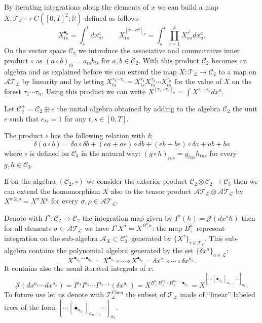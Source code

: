 \documentclass[a4paper,11pt,reqno]{article}
\newcommand{\1}{{\bf 1}}
\newcommand{\der}{\delta}
\newcommand{\RR}{\mathbb{R}}
\newcommand{\CC}{\mathcal{C}}
\newcommand{\LL}{\mathcal{L}}
\newcommand{\cac}{\mathcal C}
\newcommand{\cj}{\mathcal J}
\newcommand{\cl}{\mathcal L}
\newcommand{\TT}{\mathcal{T}}
\newcommand{\cA}{\mathcal{A}}
\newcommand{\troot}{\bullet}
\begin{document}
By iterating integrations along the elements of $x$ we can build a map $X :
\TT_\cl  \to C([0,T]^2; \RR)$ defined as follows
\begin{equation}
\label{eq:it-integrals}
X_{ts}^{\troot_a} = \int_s^t dx_u^a,
\qquad
X_{ts}^{[\tau^1 \cdots \tau^k]_a} = \int_s^t 
\prod_{i=1}^k X_{us}^{\tau^i}
dx_u^a. 
\end{equation}
On the vector space $\cac_2$ we introduce
the associative and commutative inner product $\circ$ as $(a \circ
b)_{ts} = a_{ts} b_{ts}$ for $a,b \in \cac_2$. With this product
$\cac_2$ becomes an algebra and as explained before we can extend the
map $X : \TT_\cl \to \cac_2$ to a map on $\cA
\TT_\cl$ by linearity and by letting $X^{\tau_1 \cdots \tau_n}_{ts} =
X^{\tau_1}_{ts} X^{\tau_2}_{ts} \cdots X^{\tau_n}_{ts}$ for the value
of $X$ on the forest $\tau_1\cdots\tau_n$. Using this product we can
write 
$X^{[\tau_1\cdots\tau_n]_a} = \int X^{\tau_1 \cdots \tau_n} dx^a$. 


Let $\CC^+_2 = \CC_2 \oplus e$ the unital  algebra obtained by adding
to the algebra $\CC_2$ the unit $e$ such that $e_{ts} = 1$ for any
$t,s\in[0,T]$. 

The
product $\circ$ has the following relation with $\der$:
\begin{equation}
 \label{eq:der-leib-2}
  \der (a \circ b) = \der a \circ \der b + (e a + a e)\circ \der b +
(eb+be) \circ \der a + ab + ba
\end{equation}
 where
$\circ$ is defined on $\cac_3$ in the natural way: $(g \circ
h)_{tus} = g_{tus} h_{tus}$ for every $g,h \in \cac_3$.

If on the algebra $(\cac_2,\circ)$ we consider the  exterior product $\cac_2 \otimes \cac_2
\to \cac_3$ then we can extend the homomorphism $X$ also to the tensor
product $\cA \TT_\cl \otimes \cA \TT_\cl$ by $X^{\sigma \otimes \rho}
= X^{\sigma}X^{\rho}$ for every $\sigma,\rho \in \cA \TT_\cl$.

Denote with $I^a : \CC_2 \to \CC_2$ the integration map given
by $I^a(h) = \cj( dx^a h)$ then for all elements $\sigma \in
\cA\TT_\cl$ we have  $I^a X^\sigma = X^{B_+^a \sigma}$: the map
$B_+^a$ represent integration  on the sub-algebra $\cA_X \subset
\CC^+_2$ generated by $\{X^\tau\}_{\tau \in \TT_\LL}$.
This sub-algebra contains the polynomial algebra  generated by the set $\{\der x^a\}_{a\in\LL}$:
\begin{equation}
  \label{eq:pol-in-trees}
X^{\troot_{a_1} \cdots \troot_{a_n}} = X^{\troot_{a_1}} \circ \cdots \circ X^{\troot_{a_n}}
= \der x^{a_1} \circ \cdots \circ  \der x^{a_n}.  
\end{equation}
It contains also the usual iterated integrals of $x$:
\begin{equation}
  \label{eq:chen-in-trees}
\cj(dx^{a_1} \cdots dx^{a_n}) = I^{a_1} I^{a_2} \cdots I^{a_{n-1}}( \der x^{a_n}) = X^{B_+^{a_1} B_+^{a_2}\cdots B_+^{a_{n-1}} \troot_{a_n}}
=
 X^{[\cdots[\troot_{a_n}]_{a_{n-1}}\cdots]_{a_1}}.  
\end{equation}
To future use let us denote with $\TT^{\text{Chen}}_\cl$ the subset of $\TT_\cl$ made of ``linear'' labeled trees of the form $[\cdots[\troot_{a_n}]_{a_{n-1}}\cdots]_{a_1}$. 
\end{document}
